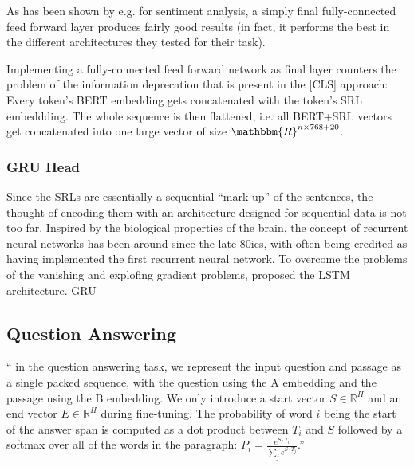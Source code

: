 
As has been shown by e.g. \cite{myagmar2019transferable} for sentiment analysis, a simply final
fully-connected feed forward layer produces fairly good results (in fact, it performs the best
in the different architectures they tested for their task).

Implementing a fully-connected feed forward network as final layer counters the problem of the
information deprecation that is present in the [CLS] approach: Every token's BERT embedding gets
concatenated with the token's SRL embeddding. The whole sequence is then flattened, i.e. all
BERT+SRL vectors get concatenated into one large vector of size $\mathbbm{R}^{n\times768+20}$.


\subsubsection{GRU Head}

Since the SRLs are essentially a sequential ``mark-up'' of the sentences, the thought of
encoding them with an architecture designed for sequential data is not too far. Inspired by
the biological properties of the brain, the concept of recurrent neural networks has been
around since the late 80ies, with \citep{hopfield1982neural} often being credited as having
implemented the first recurrent neural network. To overcome the problems of the vanishing
and explofing gradient problems, \citep{hochreiter1997long} proposed the LSTM architecture.
\citep{cho2014learning} GRU



\subsection{Question Answering}
\label{sec:question-answering}



``\textelp{} in the question answering task, we represent the input question and passage as
a single packed sequence, with the question using the A embedding and the passage using the
B embedding. We only introduce a start vector $S \in \mathbb{R}^H$ and an end vector $E \in
\mathbb{R}^H$ during fine-tuning. The probability of word $i$ being the start of the answer
span is computed as a dot product between $T_i$ and $S$ followed by a softmax over all of the
words in the paragraph: $P_i = \frac{e^{S\cdot T_i}}{\sum_{j}^{} e^{S\cdot T_j}}$.'' \citep{devlin2018bert}

